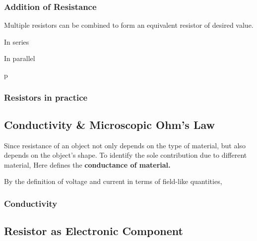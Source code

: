 \documentclass[class=article, crop=false, 12pt]{standalone}
\begin{document}
\subsubsection{Addition of Resistance}

Multiple resistors can be combined to form an equivalent resistor of desired value.

In series



In parallel



p

\subsubsection{Resistors in practice}



\subsection{Conductivity \& Microscopic Ohm's Law}

Since resistance of an object not only depends on the type of material, 
but also depends on the object's shape. 
To identify the sole contribution due to different material,
Here defines the \bf{conductance} of material.  


By the definition of voltage and current in terms of field-like quantities,


\subsubsection{Conductivity}



\subsection{Resistor as Electronic Component}
\end{document}
